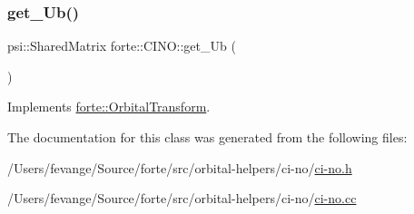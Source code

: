 \subsubsection{\texorpdfstring{get\+\_\+\+Ub()}{get\_Ub()}}
{\footnotesize\ttfamily psi\+::\+Shared\+Matrix forte\+::\+C\+I\+N\+O\+::get\+\_\+\+Ub (\begin{DoxyParamCaption}{ }\end{DoxyParamCaption})\hspace{0.3cm}{\ttfamily [virtual]}}



Implements \mbox{\hyperlink{classforte_1_1_orbital_transform_aeb179f5b68883cf346dde354c05fd27b}{forte\+::\+Orbital\+Transform}}.



The documentation for this class was generated from the following files\+:\begin{DoxyCompactItemize}
\item 
/\+Users/fevange/\+Source/forte/src/orbital-\/helpers/ci-\/no/\mbox{\hyperlink{ci-no_8h}{ci-\/no.\+h}}\item 
/\+Users/fevange/\+Source/forte/src/orbital-\/helpers/ci-\/no/\mbox{\hyperlink{ci-no_8cc}{ci-\/no.\+cc}}\end{DoxyCompactItemize}
